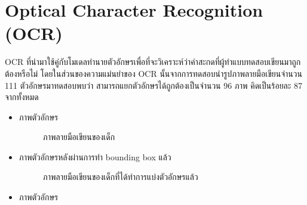 \documentclass[12pt,oneside,openright,a4paper]{cpe-thai-project}
\begin{document}
\section{Optical Character Recognition (OCR) }
  OCR ที่นำมาใช้คู่กับโมเดลทำนายตัวอักษรเพื่อที่จะวิเคราะห์ว่าคำสะกดที่ผู้ทำแบบทดสอบเขียนมาถูกต้องหรือไม่ โดยในส่วนของความแม่นยำของ OCR นั้นจากการทดสอบนำรูปภาพลายมือเขียนจำนวน 111 ตัวอักษรมาทดสอบพบว่า สามารถแยกตัวอักษรได้ถูกต้องเป็นจำนวน 96 ภาพ คิดเป็นร้อยละ 87 จากทั้งหมด
\begin{itemize}
  \item ภาพตัวอักษร
  \begin{figure}[!h]\centering
    \setlength{\fboxrule}{0.2mm} %
    \setlength{\fboxsep}{1cm}
    \caption{ภาพลายมือเขียนของเด็ก}\label{fig:system}                  
   \end{figure}
   \item ภาพตัวอักษรหลังผ่านการทำ bounding box แล้ว
   \begin{figure}[!h]\centering
     \setlength{\fboxrule}{0.2mm} %
     \setlength{\fboxsep}{1cm}
     \caption{ภาพลายมือเขียนของเด็กที่ได้ทำการแบ่งตัวอักษรแล้ว}\label{fig:system}                  
    \end{figure}
    \newpage
    \item ภาพตัวอักษร
  \begin{figure}[!h]\centering

\end{figure}
\end{itemize}
\end{document}

